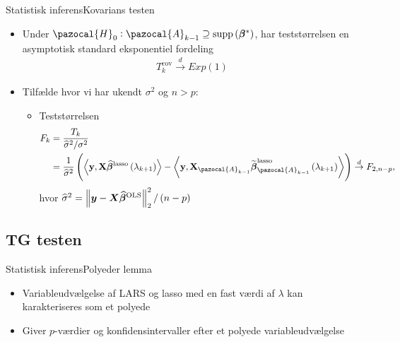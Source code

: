 \begin{frame}{Statistisk inferens}{Kovarians testen}
\begin{itemize}
\item Under $\pazocal{H}_0 : \pazocal{A}_{k-1} \supseteq \text{supp} \del{\boldsymbol\beta^*} $, har teststørrelsen en asymptotisk standard eksponentiel fordeling 
\begin{align*}
T_k^{\text{cov}} \overset{d}{\rightarrow} Exp(1)
\end{align*}
\item Tilfælde hvor vi har ukendt $\sigma^2$ og $n>p$: 
\begin{itemize}
\item Teststørrelsen
\begin{align*}
F_k & = \frac{T_k}{\widehat\sigma^2 /\sigma^2} \\
& = \frac{1}{\widehat\sigma^2}\del{ \left\langle \textbf{y}, \textbf{X} \widehat{\boldsymbol{\beta}}^\text{lasso} \del{\lambda_{k+1}} \right\rangle -  \left\langle  \textbf{y}, \textbf{X}_{\pazocal{A}_{k-1}}\widetilde{ \boldsymbol{{\beta}}}^\text{lasso}_{\pazocal{A}_{k-1}} \del{\lambda_{k+1}} \right\rangle} \overset{d}{\rightarrow} F_{2,n-p},
\end{align*}
hvor $\widehat{\sigma}^2 = \left\Vert \vy - \vX \boldsymbol{\widehat{\beta}}^\text{OLS} \right\Vert^2_2  / \del{n-p}$
\end{itemize}
\end{itemize}
\end{frame}

\subsection{TG testen}
\begin{frame}{Statistisk inferens}{Polyeder lemma}
\begin{itemize}
\item Variableudvælgelse af LARS og lasso med en fast værdi af $\lambda$ kan karakteriseres som et polyede
\item Giver $p$-værdier og konfidensintervaller efter et polyede variableudvælgelse
\end{itemize}
\end{frame}


